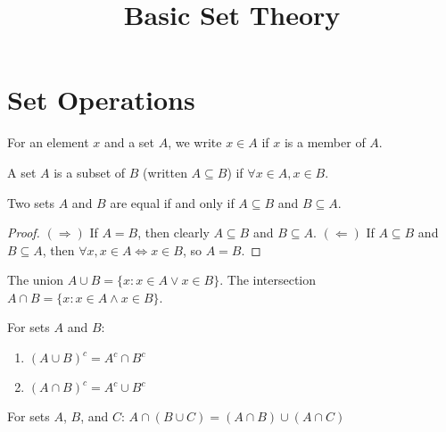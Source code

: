 \documentclass{article}
\title{Basic Set Theory}
\begin{document}
\maketitle

\section{Set Operations}

\begin{definition}
For an element $x$ and a set $A$, we write $x \in A$ if $x$ is a member of $A$.
\end{definition}

\begin{definition}[Subset]
A set $A$ is a subset of $B$ (written $A \subseteq B$) if $\forall x \in A, x \in B$.
\end{definition}

\begin{theorem}
Two sets $A$ and $B$ are equal if and only if $A \subseteq B$ and $B \subseteq A$.
\end{theorem}

\begin{proof}
$(\Rightarrow)$ If $A = B$, then clearly $A \subseteq B$ and $B \subseteq A$.
$(\Leftarrow)$ If $A \subseteq B$ and $B \subseteq A$, then $\forall x, x \in A \iff x \in B$, so $A = B$.
\end{proof}

\begin{definition}
The union $A \cup B = \{x : x \in A \lor x \in B\}$.
The intersection $A \cap B = \{x : x \in A \land x \in B\}$.
\end{definition}

\begin{theorem}
For sets $A$ and $B$:
\begin{enumerate}
\item $(A \cup B)^c = A^c \cap B^c$
\item $(A \cap B)^c = A^c \cup B^c$
\end{enumerate}
\end{theorem}

\begin{theorem}[Distributivity]
For sets $A$, $B$, and $C$:
$A \cap (B \cup C) = (A \cap B) \cup (A \cap C)$
\end{theorem}
\end{document}
